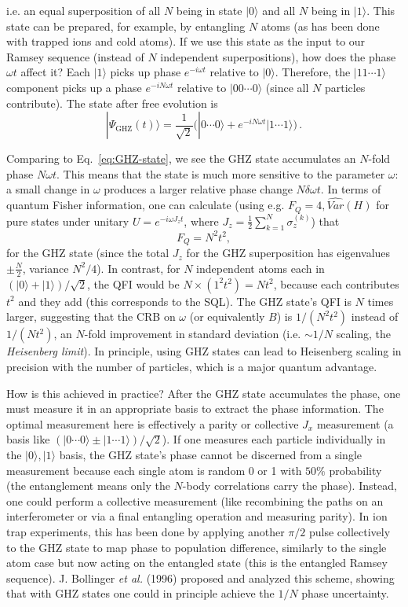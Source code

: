 i.e. an equal superposition of all $N$ being in state $|0\rangle$ and
all $N$ being in $|1\rangle$. This state can be prepared, for example,
by entangling $N$ atoms (as has been done with trapped ions and cold
atoms). If we use this state as the input to our Ramsey sequence
(instead of $N$ independent superpositions), how does the phase
$\omega t$ affect it? Each $|1\rangle$ picks up phase $e^{-i\omega t}$
relative to $|0\rangle$. Therefore, the $|11\cdots1\rangle$ component
picks up a phase $e^{-i N \omega t}$ relative to $|00\cdots0\rangle$
(since all $N$ particles contribute). The state after free evolution
is
\[
|\Psi_{\text{GHZ}}(t)\rangle = \frac{1}{\sqrt{2}}\Big(|0\cdots0\rangle + e^{-i N \omega t} |1\cdots1\rangle\Big) \,.
\]

Comparing to Eq.~\eqref{eq:GHZ-state}, we see the GHZ state
accumulates an $N$-fold phase $N\omega t$. This means that the state
is much more sensitive to the parameter $\omega$: a small change in
$\omega$ produces a larger relative phase change $N\delta\omega t$. In
terms of quantum Fisher information, one can calculate (using
e.g. $F_Q = 4,\widehat{Var}(H)$ for pure states under unitary $U=e^{-i\omega
  J_z t}$, where $J_z = \frac{1}{2}\sum_{k=1}^N \sigma^{(k)}_z$) that
\[
F_Q = N^2 t^2,
\]
for the GHZ state (since the total $J_z$ for the GHZ superposition has
eigenvalues $\pm \frac{N}{2}$, variance $N^2/4$). In contrast, for $N$
independent atoms each in $(|0\rangle+|1\rangle)/\sqrt{2}$, the QFI
would be $N \times (1^2 t^2) = N t^2$, because each contributes $t^2$
and they add (this corresponds to the SQL). The GHZ state’s QFI is $N$
times larger, suggesting that the CRB on $\omega$ (or equivalently
$B$) is $1/(N^2 t^2)$ instead of $1/(N t^2)$, an $N$-fold improvement
in standard deviation (i.e. $\sim 1/N$ scaling, the \textit{Heisenberg
  limit}). In principle, using GHZ states can lead to Heisenberg
scaling in precision with the number of particles, which is a major
quantum advantage.



How is this achieved in practice? After the GHZ state accumulates the
phase, one must measure it in an appropriate basis to extract the
phase information. The optimal measurement here is effectively a
parity or collective $J_x$ measurement (a basis like
$(|0\cdots0\rangle \pm |1\cdots1\rangle)/\sqrt{2}$). If one measures
each particle individually in the ${|0\rangle,|1\rangle}$ basis, the
GHZ state’s phase cannot be discerned from a single measurement
because each single atom is random 0 or 1 with $50\%$ probability (the
entanglement means only the $N$-body correlations carry the
phase). Instead, one could perform a collective measurement (like
recombining the paths on an interferometer or via a final entangling
operation and measuring parity). In ion trap experiments, this has
been done by applying another $\pi/2$ pulse collectively to the GHZ
state to map phase to population difference, similarly to the single
atom case but now acting on the entangled state (this is the entangled
Ramsey sequence). J. Bollinger \textit{et al.} (1996)
\cite{Bollinger1996} proposed and analyzed this scheme, showing that
with GHZ states one could in principle achieve the $1/N$ phase
uncertainty.



